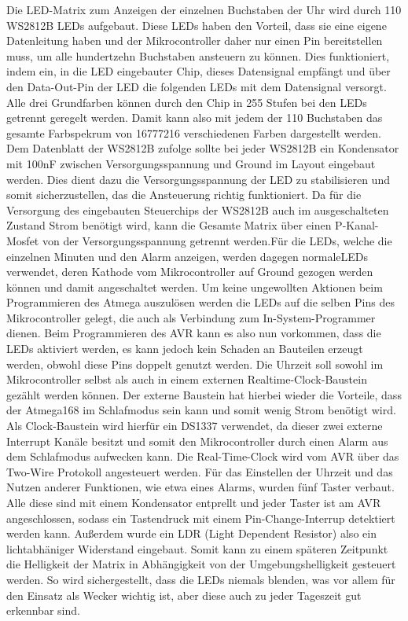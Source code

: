 \documentclass[12pt,journal,compsoc]{IEEEtran}
\begin{document}
Die LED-Matrix zum Anzeigen der einzelnen Buchstaben der Uhr wird durch 110 WS2812B LEDs aufgebaut. Diese LEDs haben den Vorteil, dass sie eine eigene Datenleitung haben und der Mikrocontroller daher nur einen Pin bereitstellen muss, um alle hundertzehn Buchstaben ansteuern zu können. Dies funktioniert, indem ein, in die LED eingebauter Chip, dieses Datensignal empfängt und über den Data-Out-Pin der LED die folgenden LEDs mit dem Datensignal versorgt. Alle drei Grundfarben können durch den Chip in 255 Stufen bei den LEDs getrennt geregelt werden. Damit kann also mit jedem der 110 Buchstaben das gesamte Farbspekrum von 16777216 verschiedenen Farben dargestellt werden. Dem Datenblatt der WS2812B zufolge sollte bei jeder WS2812B ein Kondensator mit 100nF zwischen Versorgungsspannung und Ground im Layout eingebaut werden. Dies dient dazu die Versorgungsspannung der  LED zu stabilisieren und somit sicherzustellen, das die Ansteuerung richtig funktioniert. Da für die Versorgung des eingebauten Steuerchips der WS2812B auch im ausgeschalteten Zustand Strom benötigt wird, kann die Gesamte Matrix über einen P-Kanal-Mosfet von der Versorgungsspannung getrennt werden.Für die LEDs, welche die einzelnen Minuten und den Alarm anzeigen, werden dagegen \glqq normale\grqq LEDs verwendet, deren Kathode vom Mikrocontroller auf Ground gezogen werden können und damit angeschaltet werden. Um keine ungewollten Aktionen beim Programmieren des Atmega auszulösen werden die LEDs auf die selben Pins des Mikrocontroller gelegt, die auch als Verbindung zum In-System-Programmer dienen. Beim Programmieren des AVR kann es also nun vorkommen, dass  die LEDs aktiviert werden, es kann jedoch kein Schaden an Bauteilen erzeugt werden, obwohl diese Pins doppelt genutzt werden.
Die Uhrzeit soll sowohl im Mikrocontroller selbst als auch in einem externen Realtime-Clock-Baustein gezählt werden können. Der externe Baustein hat hierbei wieder die Vorteile, dass der Atmega168 im Schlafmodus sein kann und somit wenig Strom benötigt wird. Als Clock-Baustein wird hierfür ein DS1337 verwendet, da dieser zwei externe Interrupt Kanäle besitzt und somit den Mikrocontroller durch einen Alarm aus dem Schlafmodus aufwecken kann. Die Real-Time-Clock wird vom AVR über das Two-Wire Protokoll angesteuert werden.
Für das Einstellen der Uhrzeit und das Nutzen anderer Funktionen, wie etwa eines Alarms, wurden fünf Taster verbaut. Alle diese sind mit einem Kondensator entprellt und jeder Taster ist am AVR angeschlossen, sodass ein Tastendruck mit einem Pin-Change-Interrup detektiert werden kann. 
Außerdem wurde ein LDR (Light Dependent Resistor) also ein lichtabhäniger Widerstand eingebaut. Somit kann zu einem späteren Zeitpunkt die Helligkeit der Matrix in Abhängigkeit von der Umgebungshelligkeit gesteuert werden. So wird sichergestellt, dass die LEDs niemals blenden, was vor allem für den Einsatz als Wecker wichtig ist, aber diese auch zu jeder Tageszeit gut erkennbar sind.
\end{document}
